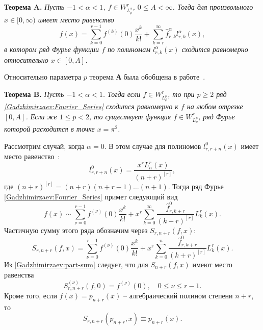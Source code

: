 \textbf{Теорема A.}
\textit{
Пусть $-1<\alpha<1$, $f\in W^r_{L^2_\rho}$, $0\le A<\infty$. Тогда для произвольного $x\in [0,\infty)$ имеет место равенство
\begin{equation*}
f(x) = \sum_{k=0}^{r-1}f^{(k)}(0)\frac{x^k}{k!}+\sum_{k=r}^{\infty} \hat{f}_{r,k}^\alpha l_{r,k}^\alpha(x),
\end{equation*}
в котором ряд Фурье функции $f$ по полиномам $l_{r,k}^{\alpha}(x)$ сходится равномерно относительно $x\in[0,A]$.
}

Относительно параметра $p$ теорема \textbf{А} была обобщена в работе~\cite{Gadzhimirzaev:RamIzv2020}.

\textbf{Теорема B.}
\textit{
Пусть $-1<\alpha<1$. Тогда если $f\in W^r_{L^p_\rho}$, то при $p\ge2$ ряд \eqref{Gadzhimirzaev:Fourier_Series} сходится равномерно к $f$ на любом отрезке $[0,A]$. Если же $1\le p<2$, то существует функция $f\in W^r_{L^p_\rho}$, ряд Фурье которой расходится в точке $x=\pi^2$.
}

Рассмотрим случай, когда $\alpha=0$. В этом случае для полиномов $l_{r,r+n}^{0}(x)$ имеет место равенство~\cite[следствие 3.1]{Gadzhimirzaev:ShII-MMG}:
\begin{equation*}
l_{r,r+n}^{0}(x)=\frac{x^r L_n^r(x)}{(n+r)^{[r]}},
\end{equation*}
где $(n+r)^{[r]}=(n+r)(n+r-1)\ldots(n+1)$.
Тогда ряд Фурье \eqref{Gadzhimirzaev:Fourier_Series} примет следующий вид
\begin{equation*}
f(x)\sim \sum_{\nu=0}^{r-1}f^{(\nu)}(0)\frac{x^k}{k!}+x^r\sum_{k=0}^{\infty} \frac{\hat{f}_{r,k+r}^0}{(k+r)^{[r]}}L_k^r(x).
\end{equation*}
Частичную сумму этого ряда обозначим через $S_{r,n+r}(f,x)$:
\begin{equation}\label{Gadzhimirzaev:part-sum}
S_{r,n+r}(f,x)=\sum_{\nu=0}^{r-1}f^{(\nu)}(0)\frac{x^k}{k!}+x^r\sum_{k=0}^{n} \frac{\hat{f}_{r,k+r}^0}{(k+r)^{[r]}}L_k^r(x).
\end{equation}
Из \eqref{Gadzhimirzaev:part-sum} следует, что для $S_{n+r}(f,x)$ имеют место равенства
\begin{equation*}
S_{r,n+r}^{(\nu)}(f,0)=f^{(\nu)}(0), \quad 0\le\nu\le r-1.
\end{equation*}
Кроме того, если $f(x)=p_{n+r}(x)$ -- алгебраический полином степени $n+r$, то
\begin{equation}\label{Gadzhimirzaev:part-sum-second-prop}
S_{r,n+r}(p_{n+r},x)\equiv p_{n+r}(x).
\end{equation}

